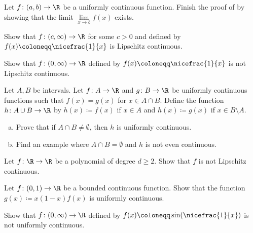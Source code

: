\begin{exercise}
Let $f \colon (a,b) \to \R$ be a uniformly continuous function.
Finish the proof of  by showing that
the limit
$\lim\limits_{x \to b} f(x)$
exists.
\end{exercise}

\begin{exercise}
Show that $f \colon (c,\infty) \to \R$ for some $c > 0$
and defined by $f(x) \coloneqq \nicefrac{1}{x}$ is Lipschitz continuous.
\end{exercise}

\begin{exercise}
Show that $f \colon (0,\infty) \to \R$
defined by $f(x) \coloneqq \nicefrac{1}{x}$ is not Lipschitz continuous.
\end{exercise}

\begin{samepage}
\begin{exercise}
Let $A, B$ be intervals.
Let $f \colon A \to \R$ and $g \colon B \to \R$ be uniformly continuous
functions such that $f(x) = g(x)$ for $x \in A \cap B$.  Define
the function $h \colon A \cup B \to \R$ by $h(x) \coloneqq f(x)$ if
$x \in A$ and $h(x) \coloneqq g(x)$ if $x \in B \setminus A$.
\begin{enumerate}[a)]
\item
Prove that if $A \cap B \not= \emptyset$, then $h$ is uniformly continuous.
\item
Find an example where $A \cap B = \emptyset$ and $h$ is not even
continuous.
\end{enumerate}
\end{exercise}
\end{samepage}

\begin{exercise}[Challenging]
Let $f \colon \R \to \R$ be a polynomial of degree 
$d \geq 2$.  Show that $f$ is not Lipschitz
continuous.
\end{exercise}

\begin{exercise}
Let $f \colon (0,1) \to \R$ be a bounded continuous function.  Show that
the function
$g(x) \coloneqq x(1-x)f(x)$ is uniformly continuous.
\end{exercise}

\begin{exercise}
Show that $f \colon (0,\infty) \to \R$ defined by $f(x) \coloneqq \sin
(\nicefrac{1}{x})$ is not uniformly continuous.
\end{exercise}

